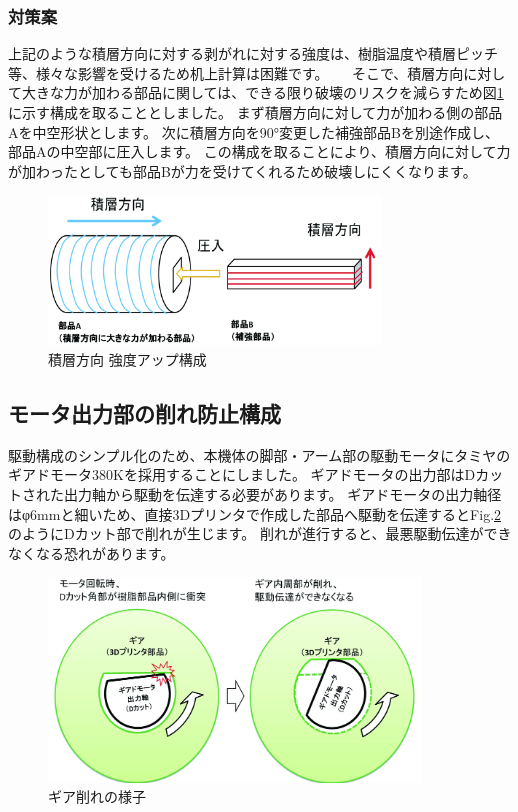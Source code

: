 \subsubsection{対策案}\label{ux5bfeux7b56ux6848}

上記のような積層方向に対する剥がれに対する強度は、樹脂温度や積層ピッチ等、様々な影響を受けるため机上計算は困難です。
　
そこで、積層方向に対して大きな力が加わる部品に関しては、できる限り破壊のリスクを減らすため図\ref{fig13}に示す構成を取ることとしました。
まず積層方向に対して力が加わる側の部品Aを中空形状とします。
次に積層方向を90°変更した補強部品Bを別途作成し、部品Aの中空部に圧入します。
この構成を取ることにより、積層方向に対して力が加わったとしても部品Bが力を受けてくれるため破壊しにくくなります。

\begin{figure}[htbp]
\centering
\includegraphics[width=250pt]{fig/fig13_cmyk.jpg}
\caption{積層方向 強度アップ構成}
\label{fig13}
\end{figure}

\clearpage

\subsection{モータ出力部の削れ防止構成}\label{ux30e2ux30fcux30bfux51faux529bux90e8ux306eux524aux308cux9632ux6b62ux69cbux6210}

駆動構成のシンプル化のため、本機体の脚部・アーム部の駆動モータにタミヤのギアドモータ380K\cite{tamiya_380k}を採用することにしました。
ギアドモータの出力部はDカットされた出力軸から駆動を伝達する必要があります。
ギアドモータの出力軸径はφ6mmと細いため、直接3Dプリンタで作成した部品へ駆動を伝達するとFig.\ref{fig14}のようにDカット部で削れが生じます。
削れが進行すると、最悪駆動伝達ができなくなる恐れがあります。

\begin{figure}[htbp]
\centering
\includegraphics[width=280pt]{fig/fig14_cmyk.jpg}
\caption{ギア削れの様子}
\label{fig14}
\end{figure}

